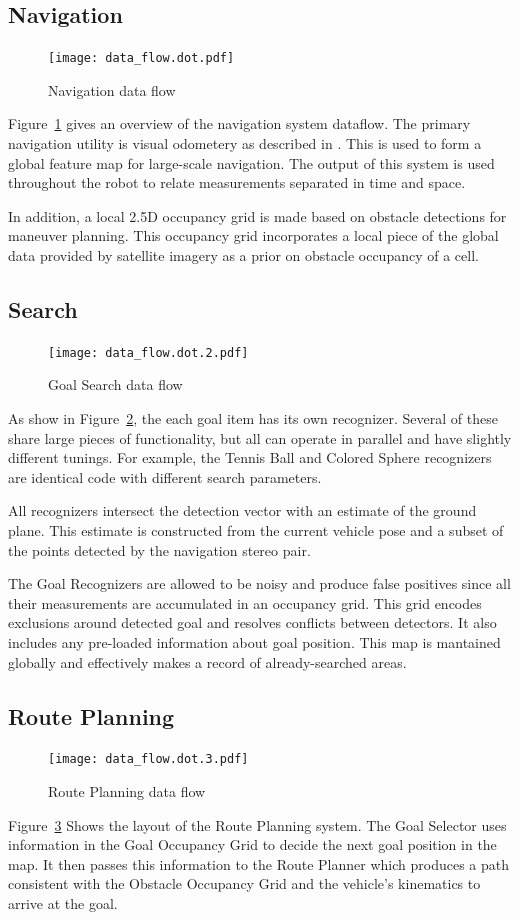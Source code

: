 \documentclass[12pt]{article}
\begin{document}
\subsection{Navigation}\label{Navigation}
\begin{figure}[htbp]
\centering
\texttt{[image: data\_flow.dot.pdf]}
\caption{Navigation data flow}
\label{fig_df_nav}
\end{figure}
Figure~\ref{fig_df_nav} gives an overview of the navigation system dataflow. The primary navigation utility is visual odometery as described in \cite{KKonoLSVO}. This is used to form a global feature map for large-scale navigation. The output of this system is used throughout the robot to relate measurements separated in time and space.

In addition, a local 2.5D occupancy grid is made based on obstacle detections for maneuver planning. This occupancy grid incorporates a local piece of the global data provided by satellite imagery as a prior on obstacle occupancy of a cell.

\subsection{Search}\label{Search}
\begin{figure}[htbp]
\centering
\texttt{[image: data\_flow.dot.2.pdf]}
\caption{Goal Search data flow}
\label{fig_df_gs}
\end{figure}
As show in Figure~\ref{fig_df_gs}, the each goal item has its own recognizer. Several of these share large pieces of functionality, but all can operate in parallel and have slightly different tunings. For example, the Tennis Ball and Colored Sphere recognizers are identical code with different search parameters.

All recognizers intersect the detection vector with an estimate of the ground plane. This estimate is constructed from the current vehicle pose and a subset of the points detected by the navigation stereo pair.

The Goal Recognizers are allowed to be noisy and produce false positives since all their measurements are accumulated in an occupancy grid. This grid encodes exclusions around detected goal and resolves conflicts between detectors. It also includes any pre-loaded information about goal position. This map is mantained globally and effectively makes a record of already-searched areas.

\subsection{Route Planning}
\begin{figure}[htbp]
\centering
\texttt{[image: data\_flow.dot.3.pdf]}
\caption{Route Planning data flow}
\label{fig_df_rp}
\end{figure}
Figure~\ref{fig_df_rp} Shows the layout of the Route Planning system. The Goal Selector uses information in the Goal Occupancy Grid to decide the next goal position in the map. It then passes this information to the Route Planner which produces a path consistent with the Obstacle Occupancy Grid and the vehicle's kinematics to arrive at the goal.
\end{document}
